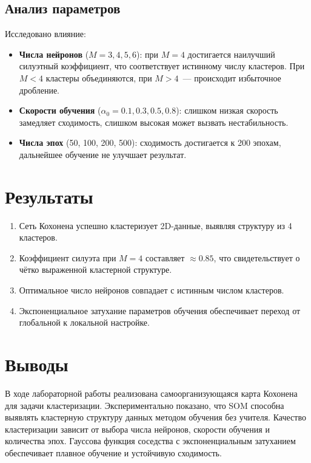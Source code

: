 \documentclass[14pt,a4paper]{extarticle}
\begin{document}
\subsection{Анализ параметров}

Исследовано влияние:
\begin{itemize}
\item \textbf{Числа нейронов} ($M = 3, 4, 5, 6$): при $M = 4$ достигается наилучший силуэтный коэффициент, что соответствует истинному числу кластеров. При $M < 4$ кластеры объединяются, при $M > 4$~--- происходит избыточное дробление.
\item \textbf{Скорости обучения} ($\alpha_0 = 0.1, 0.3, 0.5, 0.8$): слишком низкая скорость замедляет сходимость, слишком высокая может вызвать нестабильность.
\item \textbf{Числа эпох} (50, 100, 200, 500): сходимость достигается к 200 эпохам, дальнейшее обучение не улучшает результат.
\end{itemize}

\section{Результаты}

\begin{enumerate}
\item Сеть Кохонена успешно кластеризует 2D-данные, выявляя структуру из 4 кластеров.
\item Коэффициент силуэта при $M = 4$ составляет $\approx 0.85$, что свидетельствует о чётко выраженной кластерной структуре.
\item Оптимальное число нейронов совпадает с истинным числом кластеров.
\item Экспоненциальное затухание параметров обучения обеспечивает переход от глобальной к локальной настройке.
\end{enumerate}

\section{Выводы}

В ходе лабораторной работы реализована самоорганизующаяся карта Кохонена для задачи кластеризации. Экспериментально показано, что SOM способна выявлять кластерную структуру данных методом обучения без учителя. Качество кластеризации зависит от выбора числа нейронов, скорости обучения и количества эпох. Гауссова функция соседства с экспоненциальным затуханием обеспечивает плавное обучение и устойчивую сходимость.
\end{document}
